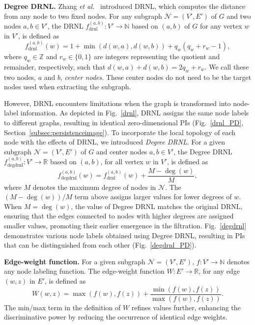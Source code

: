 \noindent\textbf{Degree DRNL.}
Zhang \textit{et al.}~\cite{zhang2018link} introduced DRNL, which computes the distance from any node to two fixed nodes.
For any subgraph $\mathcal{N}=(V',E')$ of $G$ and two nodes $a,b \in V'$, the DRNL $f^{(a,b)}_{\text{drnl}}: V' \rightarrow \mathbb{N}$ based on $(a,b)$ of $G$ for any vertex $w$ in $V'$, is defined as
\[
    f^{(a,b)}_{\text{drnl}}(w) = 1 + \min(d(w,a), d(w,b)) + q_w(q_w + r_w - 1),
\]
where $q_w \in \mathbb{Z}$ and $r_w \in \{ 0, 1\}$ are integers representing the quotient and remainder, respectively, such that $d(w,a)+d(w,b) = 2q_w + r_w$. 
We call these two nodes, $a$ and $b$, \textit{center nodes}.
These center nodes do not need to be the target nodes used when extracting the subgraph.

However, DRNL encounters limitations when the graph is transformed into node-label information.
As depicted in Fig.~\ref{drnl}, DRNL assigns the same node labels to different graphs, resulting in identical zero-dimensional PIs (Fig.~\ref{drnl_PD}, Section~\ref{subsec:persistenceimage}).
To incorporate the local topology of each node with the effects of DRNL, we introduced \textit{Degree DRNL}. 
For a given subgraph \( \mathcal{N} = (V', E') \) of $G$ and center nodes $a,b \in V'$, the Degree DRNL $f^{(a,b)}_{\text{degdrnl}} : V' \rightarrow \mathbb{R}$  based on $(a,b)$, for all vertex \( w \) in \( V' \), is defined as
\[
    f^{(a,b)}_{\text{degdrnl}}(w) = f^{(a,b)}_{\text{drnl}}(w) + \frac{M - \deg(w)}{M},
\]
where \( M \) denotes the maximum degree of nodes in \( \mathcal{N}\).
The $(M-\deg(w))/M$ term above assigns larger values for lower degrees of $w$. When $M = \deg(w)$, the value of Degree DRNL matches the original DRNL, ensuring that the edges connected to nodes with higher degrees are assigned smaller values, promoting their earlier emergence in the filtration.
Fig.~\ref{degdrnl} demonstrates various node labels obtained using Degree DRNL, resulting in PIs that can be distinguished from each other (Fig.~\ref{degdrnl_PD}). 


\noindent\textbf{Edge-weight function.} 
For a given subgraph \( \mathcal{N} = (V', E') \), \( f : V' \rightarrow \mathbb{N} \) denotes any node labeling function.
The edge-weight function $W:E' \rightarrow \mathbb{R}$, for any edge \( (w, z) \) in \( E' \), is defined as 
\[
W(w,z) =\max(f(w),f(z)) + \frac{\min(f(w),f(z))}{\max(f(w),f(z))}.
\]
The min/max term in the definition of $W$ refines values further, enhancing the discriminative power by reducing the occurrence of identical edge weights.


